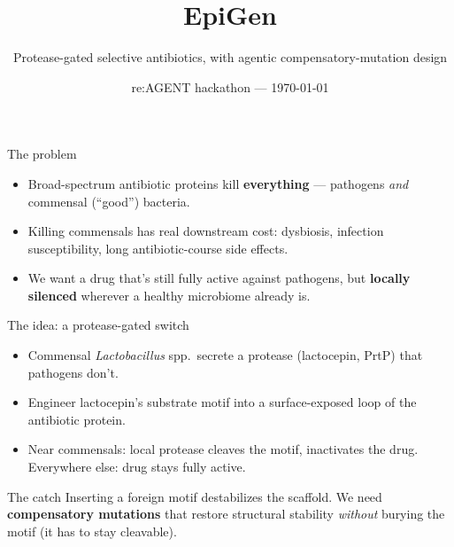 \documentclass[aspectratio=169]{beamer}
\title{EpiGen}
\subtitle{Protease-gated selective antibiotics, with agentic compensatory-mutation design}
\author{}
\date{re:AGENT hackathon --- \today}
\begin{document}
\begin{frame}
  \titlepage
\end{frame}

\begin{frame}{The problem}
  \begin{itemize}
    \item Broad-spectrum antibiotic proteins kill \textbf{everything} --- pathogens
      \emph{and} commensal (``good'') bacteria.
    \item Killing commensals has real downstream cost: dysbiosis, infection
      susceptibility, long antibiotic-course side effects.
    \item We want a drug that's still fully active against pathogens, but
      \textbf{locally silenced} wherever a healthy microbiome already is.
  \end{itemize}
\end{frame}

\begin{frame}{The idea: a protease-gated switch}
  \begin{itemize}
    \item Commensal \emph{Lactobacillus} spp.\ secrete a protease (lactocepin,
      PrtP) that pathogens don't.
    \item Engineer lactocepin's substrate motif into a surface-exposed loop of
      the antibiotic protein.
    \item Near commensals: local protease cleaves the motif, inactivates the
      drug. Everywhere else: drug stays fully active.
  \end{itemize}
  \vspace{0.5em}
  \begin{block}{The catch}
    Inserting a foreign motif destabilizes the scaffold. We need
    \textbf{compensatory mutations} that restore structural stability
    \emph{without} burying the motif (it has to stay cleavable).
  \end{block}
\end{frame}
\end{document}
